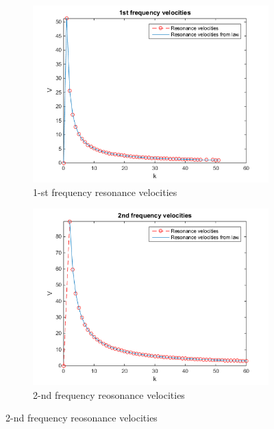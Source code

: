 \documentclass[10pt,a4paper,final]{report}
\begin{document}
\begin{figure}[h]
        \centering
        \begin{subfigure}[t]{0.5\textwidth}
                \includegraphics[width=\textwidth]{train1}
                \caption{1-st frequency resonance velocities}
                \label{fig:train1}
        \end{subfigure}%
        \begin{subfigure}[t]{0.5\textwidth}
                \includegraphics[width=\textwidth]{train2}
                \caption{2-nd frequency reosonance velocities}
                \label{fig:train2}
        \end{subfigure}
         \label{fig:train}
\end{figure}
\end{document}
